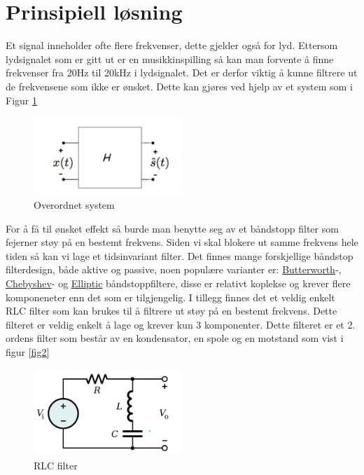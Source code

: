 \newpage
\section{Prinsipiell løsning}
\label{prinsipiellLoesning}


Et signal inneholder ofte flere frekvenser, dette gjelder også for lyd. Ettersom lydsignalet som er gitt ut er en musikkinspilling så kan man forvente å finne frekvenser fra 20Hz til 20kHz \cite{Frq_in_audio} i lydsignalet. Det er derfor viktig å kunne filtrere ut de frekvensene som ikke er ønsket. Dette kan gjøres ved hjelp av et system som i Figur \ref{fig:fig1}

\begin{figure}[!h]
	\centering
	\includegraphics[width=0.5\textwidth]{Bilder/Overordnetsystem.png}
	\caption{Overordnet system}
	\label{fig:fig1}
\end{figure}

For å få til ønsket effekt så burde man benytte seg av et båndstopp filter som fejerner støy på en bestemt frekvens. Siden vi skal blokere ut samme frekvens hele tiden så kan vi lage et tidsinvariant filter. Det finnes mange forskjellige båndstop filterdesign, både aktive og passive, noen populære varianter er: \href{https://www.falstad.com/afilter/circuitjs.html?cct=$+1+0.000005+5+50+5+50%0A%25+0+4540.3852025771785%0Ar+928+256+928+432+0+50%0A170+784+256+752+256+2+20+4000+5+0.1%0AO+928+256+992+256+0%0Aw+784+208+784+256+0%0Aw+864+208+864+256+0%0Ag+864+432+864+448+0%0Ag+928+432+928+448+0%0Ac+784+256+864+256+0+0.000004593296450259804+0%0Ac+864+352+864+432+0+1.7108344904994753e-7+0%0Al+784+208+864+208+0+0.0008554172452497378+0%0Al+864+256+864+352+0+0.022966482251299023+0%0AB+784+128+864+528+3+Box%0Aw+864+256+928+256+0%0A}{Butterworth}-, \href{https://en.wikipedia.org/wiki/Chebyshev_filter}{Chebyshev}- og \href{https://www.sciencedirect.com/topics/engineering/elliptic-filters}{Elliptic} båndstoppfiltere, disse er relativt koplekse og krever flere komponeneter enn det som er tilgjengelig. I tillegg finnes det et veldig enkelt RLC filter som kan brukes til å filtrere ut støy på en bestemt frekvens. Dette filteret er veldig enkelt å lage og krever kun 3 komponenter. Dette filteret er et 2. ordens filter som består av en kondensator, en spole og en motstand som vist i figur \ref{fig2}

\begin{figure}[!h]
	\centering
	\includegraphics[width=0.5\textwidth]{Bilder/Band-Reject_Filter.svg.png}
	\caption{RLC filter}
	\label{fig:fig2}
\end{figure}